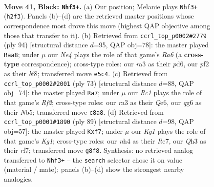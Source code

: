 \documentclass[11pt]{article}
\begin{document}
\clearpage

\begin{figure}[p]\centering
\begin{subfigure}{0.46\textwidth}\centering
\resizebox{\linewidth}{!}{%
\newchessgame
\chessboard[
  setfen={2r3k1/6p1/1p4Q1/r2pn3/P3p2N/R6q/2P2P1n/3R2K1 b - - 5 41},
  showmover=false,
  pgfstyle=straightmove, color=movearrow, markmove={h2-f3}
]}
\caption{}
\end{subfigure}\hfill
\begin{subfigure}{0.46\textwidth}\centering
\resizebox{\linewidth}{!}{%
\newchessgame
\chessboard[
  setfen={2R1Nb2/1r3k2/R2p4/1p1PqP2/1pn1P1p1/6P1/4Q2K/8 w - - 0 48},
  showmover=false,
  pgfstyle=straightmove, color=movearrow, markmove={a6-a8}
]}
\caption{}
\end{subfigure}
\\[4pt]
\begin{subfigure}{0.46\textwidth}\centering
\resizebox{\linewidth}{!}{%
\newchessgame
\chessboard[
  setfen={6k1/5r2/R1p1q3/1n1p2pP/3P2N1/3Q1p1P/p3rP1K/R7 b - - 1 37},
  showmover=false,
  pgfstyle=straightmove, color=movearrow, markmove={f7-a7}
]}
\caption{}
\end{subfigure}\hfill
\begin{subfigure}{0.46\textwidth}\centering
\resizebox{\linewidth}{!}{%
\newchessgame
\chessboard[
  setfen={6k1/p3rR2/1nQ1q3/1P1p3p/3P2p1/4P1P1/3NR3/6K1 b - - 0 45},
  showmover=false,
  pgfstyle=straightmove, color=movearrow, markmove={g8-f7}
]}
\caption{}
\end{subfigure}
\caption{\textbf{Move 41, Black: \texttt{Nhf3+}.} (a) Our position; Melanie plays \texttt{Nhf3+} (\texttt{h2f3}). Panels (b)--(d) are the retrieved master positions whose correspondence most drove this move (highest QAP objective among those that transfer to it). (b) Retrieved from \texttt{ccrl\_top\_p0002\#2779} (ply 94) [structural distance $d$=95, QAP obj=78]: the master played \texttt{Raa8}; under $\mu$ our \emph{Ne4} plays the role of that game's \emph{Ra6} (a \textbf{cross-type} correspondence); cross-type roles: our \emph{r}a3 as their \emph{p}d6, our \emph{p}f2 as their \emph{b}f8; transferred move \texttt{e5c4}. (c) Retrieved from \texttt{ccrl\_top\_p0002\#2001} (ply 73) [structural distance $d$=88, QAP obj=74]: the master played \texttt{Ra7}; under $\mu$ our \emph{Rc1} plays the role of that game's \emph{Rf2}; cross-type roles: our \emph{r}a3 as their \emph{Q}e6, our \emph{q}g6 as their \emph{N}b5; transferred move \texttt{c8a8}. (d) Retrieved from \texttt{ccrl\_top\_p0001\#1890} (ply 89) [structural distance $d$=98, QAP obj=57]: the master played \texttt{Kxf7}; under $\mu$ our \emph{Kg1} plays the role of that game's \emph{Kg1}; cross-type roles: our \emph{n}h4 as their \emph{R}e7, our \emph{Q}h3 as their \emph{r}f7; transferred move \texttt{g8f8}. Synthesis: no retrieved analog transferred to \texttt{Nhf3+} -- the \texttt{search} selector chose it on value (material / mate); panels (b)--(d) show the strongest nearby analogies.}
\label{fig:thought-m81}
\end{figure}
\end{document}
